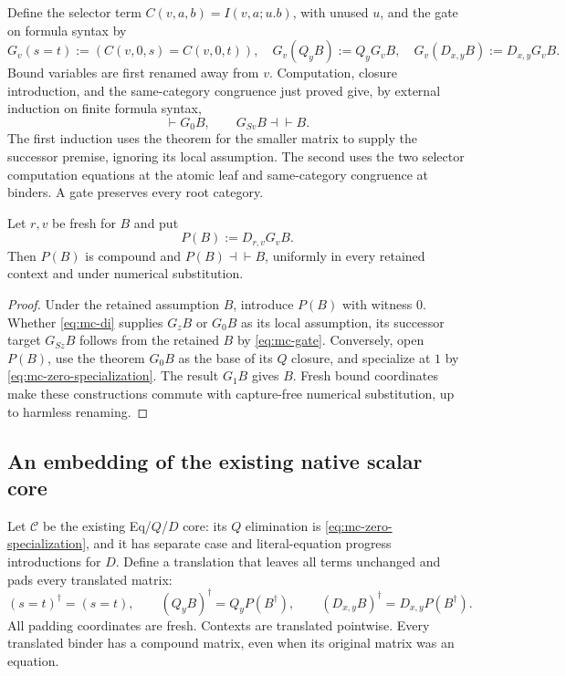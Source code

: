 Define the selector term $C(v,a,b)=I(v,a;u.b)$, with unused $u$,
and the gate on formula syntax by
\[
 G_v(s=t):=(C(v,0,s)=C(v,0,t)),\quad
 G_v(Q_yB):=Q_yG_vB,\quad
 G_v(D_{x,y}B):=D_{x,y}G_vB.
\]
Bound variables are first renamed away from $v$.  Computation,
closure introduction, and the same-category congruence just proved
give, by external induction on finite formula syntax,
\[
 \vdash G_0B,\qquad G_{Sv}B\dashv\vdash B.
 \tag{MC8}\label{eq:mc-gate}
\]
The first induction uses the theorem for the smaller matrix to supply
the successor premise, ignoring its local assumption.  The second
uses the two selector computation equations at the atomic leaf and
same-category congruence at binders.  A gate preserves every root category.

\begin{lemma}
\label{lem:mc-padding}
Let $r,v$ be fresh for $B$ and put
\[
                 P(B):=D_{r,v}G_vB.
\]
Then $P(B)$ is compound and $P(B)\dashv\vdash B$, uniformly in
every retained context and under numerical substitution.
\end{lemma}
\begin{proof}
Under the retained assumption $B$, introduce $P(B)$ with witness $0$.
Whether \eqref{eq:mc-di} supplies $G_zB$ or $G_0B$ as its local
assumption, its successor target $G_{Sz}B$ follows from the retained
$B$ by \eqref{eq:mc-gate}.  Conversely, open $P(B)$, use the theorem
$G_0B$ as the base of its $Q$ closure, and specialize at $1$ by
\eqref{eq:mc-zero-specialization}.  The result $G_1B$ gives $B$.
Fresh bound coordinates make these constructions commute with
capture-free numerical substitution, up to harmless renaming.
\end{proof}

\subsection{An embedding of the existing native scalar core}

Let $\mathcal C$ be the existing Eq/$Q$/$D$ core: its $Q$ elimination
is \eqref{eq:mc-zero-specialization}, and it has separate case and
literal-equation progress introductions for $D$.  Define a translation
that leaves all terms unchanged and pads every translated matrix:
\[
 (s=t)^\dagger=(s=t),\qquad
 (Q_yB)^\dagger=Q_yP(B^\dagger),\qquad
 (D_{x,y}B)^\dagger=D_{x,y}P(B^\dagger).
 \tag{MC9}\label{eq:mc-embed}
\]
All padding coordinates are fresh.  Contexts are translated pointwise.
Every translated binder has a compound matrix, even when its original
matrix was an equation.

